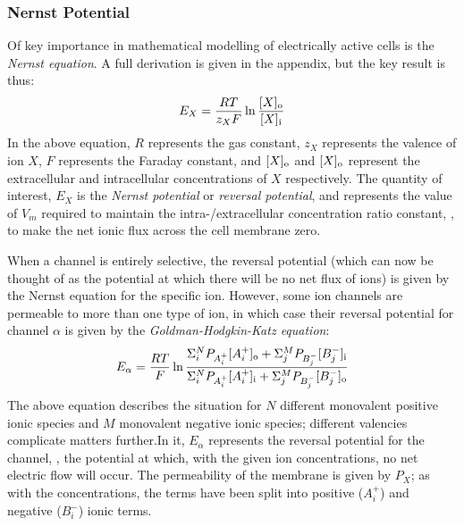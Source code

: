 \documentclass[../thesis-main.tex]{subfiles}
\begin{document}
 \subsubsection{Nernst Potential}
 \label{subsubsec:nernst}
 Of key importance in mathematical modelling of electrically active cells is the \emph{Nernst equation}. A full derivation is given in the appendix, but the key result is thus:
 \begin{equation}
  E_X = \frac{RT}{z_XF}\ln\frac{[X]_\textnormal{o}}{[X]_\textnormal{i}}
 \end{equation}
 In the above equation, $R$ represents the gas constant, $z_X$ represents the valence of ion $X$, $F$ represents the Faraday constant, and $[X]_\textnormal{o}$ and $[X]_\textnormal{o}$ represent the extracellular and intracellular concentrations of $X$ respectively. The quantity of interest, $E_X$ is the \emph{Nernst potential} or \emph{reversal potential}, and represents the value of $V_m$ required to maintain the intra-/extracellular concentration ratio constant, \idest, to make the net ionic flux across the cell membrane zero.
 
 When a channel is entirely selective, the reversal potential (which can now be thought of as the potential at which there will be no net flux of ions) is given by the Nernst equation for the specific ion. However, some ion channels are permeable to more than one type of ion, in which case their reversal potential for channel $\alpha$ is given by the \emph{Goldman-Hodgkin-Katz equation}:
 \begin{equation}
  E_\alpha = \frac{RT}{F}\ln\frac{\Sigma_i^N P_{A_i^+}[A_i^+]_\textnormal{o} + \Sigma_j^M P_{B_j^-}[B_j^-]_\textnormal{i}}{\Sigma_i^N P_{A_i^+}[A_i^+]_\textnormal{i} + \Sigma_j^M P_{B_j^-}[B_j^-]_\textnormal{o}}
 \end{equation}
 The above equation describes the situation for $N$ different monovalent positive ionic species and $M$ monovalent negative ionic species; different valencies complicate matters further.In it, $E_\alpha$ represents the reversal potential for the channel, \idest, the potential at which, with the given ion concentrations, no net electric flow will occur. The permeability of the membrane is given by $P_X$; as with the concentrations, the terms have been split into positive ($A_i^+$) and negative ($B_i^-$) ionic terms.
 
\end{document}
